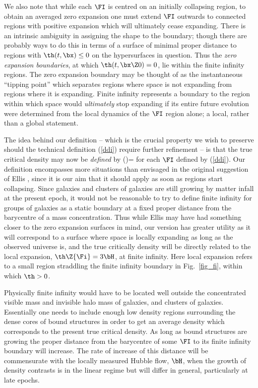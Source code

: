 \documentclass[12pt]{iopart}
\begin{document}
We also note that while each $\FI$ is centred on an initially collapsing
region, to obtain an averaged zero expansion one must extend $\FI$
outwards to connected regions with positive expansion which will ultimately
cease expanding. There is an intrinsic ambiguity in assigning the shape
to the boundary; though there are probably ways to do this in terms of
a surface of minimal proper distance to regions with $\th(t,\bx)\le0$
on the hypersurfaces in question. Thus the {\em zero expansion boundaries},
at which $\th(t,\bx\Z0)=0$, lie within the finite infinity regions. The
zero expansion boundary may be thought of as the instantaneous
``tipping point'' which separates regions where space is not expanding
from regions where it is expanding. Finite infinity represents a boundary
to the region within which space would {\em ultimately} stop expanding if its
entire future evolution were determined from the local dynamics of
the $\FI$ region alone; a local, rather than a global statement.

The idea behind our definition -- which is the crucial property we wish
to preserve should the technical definition (\ref{ddi}) require further
refinement -- is that the true critical density may now be {\em defined} by
\beq
\rhcr(\tc)=\ave{\rh(\tc,\bx)}\Z{\Fi}
\label{truecr}\eeq
for each $\FI$ defined by (\ref{ddi}). Our definition encompasses more
situations than envisaged in the original suggestion of Ellis \cite{fit1},
since it is our aim that it should apply as soon as regions start collapsing.
Since galaxies and clusters of galaxies are still growing by matter infall
at the present epoch, it would not be reasonable to try to define finite
infinity for groups of galaxies as a static boundary at a fixed proper
distance from the barycentre of a mass concentration. Thus while Ellis
may have had something closer to the zero expansion surfaces in mind,
our version has greater utility as it will correspond to a surface where
space is locally expanding as long as the observed universe is, and the
true critically density will be directly related to the local expansion,
$\th\Z{\Fi}=3\bH$, at finite infinity. Here local expansion refers to a
small region straddling the finite infinity boundary in Fig.~\ref{fig_fi},
within which $\th>0$.

Physically finite infinity would have to be located well outside the
concentrated visible mass and invisible halo mass of galaxies, and clusters
of galaxies. Essentially one needs to include enough low density regions
surrounding the dense cores of bound structures in order to get
an average density which corresponds to the present true critical density.
As long as bound structures are growing the proper distance from the
barycentre of some $\FI$ to its finite infinity boundary will increase.
The rate of increase of this distance will be commensurate with the locally
measured Hubble flow, $\bH$, when the growth of density contrasts is in the
linear regime but will differ in general, particularly at late epochs.
\end{document}
